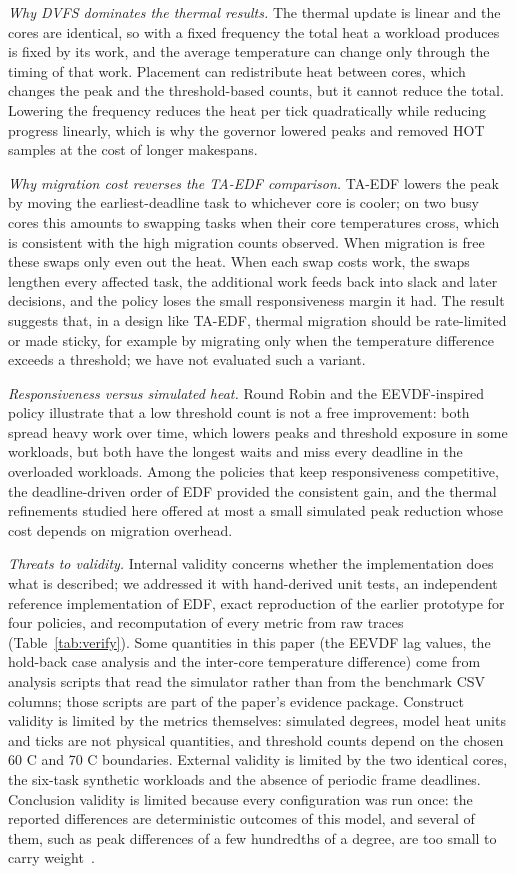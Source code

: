 \documentclass[conference]{IEEEtran}
\begin{document}
\emph{Why DVFS dominates the thermal results.} The thermal update is linear and the cores are identical, so with a fixed frequency the total heat a workload produces is fixed by its work, and the average temperature can change only through the timing of that work. Placement can redistribute heat between cores, which changes the peak and the threshold-based counts, but it cannot reduce the total. Lowering the frequency reduces the heat per tick quadratically while reducing progress linearly, which is why the governor lowered peaks and removed HOT samples at the cost of longer makespans.

\emph{Why migration cost reverses the TA-EDF comparison.} TA-EDF lowers the peak by moving the earliest-deadline task to whichever core is cooler; on two busy cores this amounts to swapping tasks when their core temperatures cross, which is consistent with the high migration counts observed. When migration is free these swaps only even out the heat. When each swap costs work, the swaps lengthen every affected task, the additional work feeds back into slack and later decisions, and the policy loses the small responsiveness margin it had. The result suggests that, in a design like TA-EDF, thermal migration should be rate-limited or made sticky, for example by migrating only when the temperature difference exceeds a threshold; we have not evaluated such a variant.

\emph{Responsiveness versus simulated heat.} Round Robin and the EEVDF-inspired policy illustrate that a low threshold count is not a free improvement: both spread heavy work over time, which lowers peaks and threshold exposure in some workloads, but both have the longest waits and miss every deadline in the overloaded workloads. Among the policies that keep responsiveness competitive, the deadline-driven order of EDF provided the consistent gain, and the thermal refinements studied here offered at most a small simulated peak reduction whose cost depends on migration overhead.

\emph{Threats to validity.} Internal validity concerns whether the implementation does what is described; we addressed it with hand-derived unit tests, an independent reference implementation of EDF, exact reproduction of the earlier prototype for four policies, and recomputation of every metric from raw traces (Table~\ref{tab:verify}). Some quantities in this paper (the EEVDF lag values, the hold-back case analysis and the inter-core temperature difference) come from analysis scripts that read the simulator rather than from the benchmark CSV columns; those scripts are part of the paper's evidence package. Construct validity is limited by the metrics themselves: simulated degrees, model heat units and ticks are not physical quantities, and threshold counts depend on the chosen 60 \textdegree{}C and 70 \textdegree{}C boundaries. External validity is limited by the two identical cores, the six-task synthetic workloads and the absence of periodic frame deadlines. Conclusion validity is limited because every configuration was run once: the reported differences are deterministic outcomes of this model, and several of them, such as peak differences of a few hundredths of a degree, are too small to carry weight~\cite{hoefler2015}.
\end{document}
